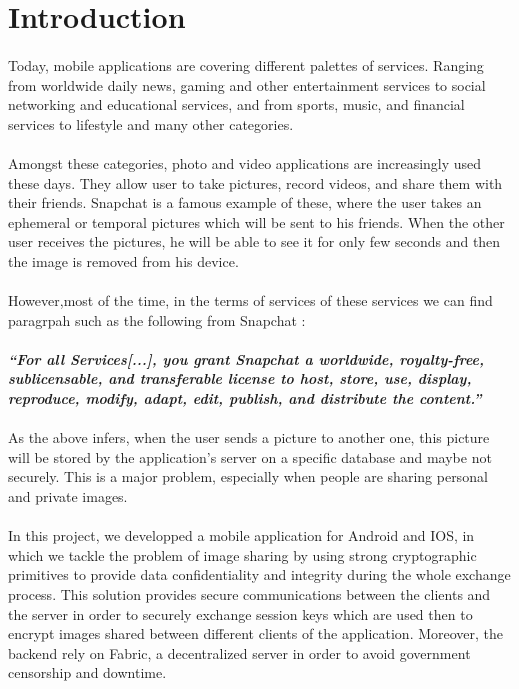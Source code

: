 \section{Introduction}
   \paragraph{}
    Today, mobile applications are covering different palettes of services. Ranging from worldwide daily news, gaming and other entertainment services to social networking and educational services, and from sports, music, and financial services to lifestyle and many other categories.
   \paragraph{}
    Amongst these categories, photo and video applications are increasingly used these days. They allow user to take pictures, record videos, and share them with their friends. Snapchat is a famous example of these, where the user takes an ephemeral or temporal pictures which will be sent to his friends. When the other user receives the pictures, he will be able to see it for only few seconds and then the image is removed from his device.
    \paragraph{}
    However,most of the time, in the terms of services of these services we can find paragrpah such as the following from Snapchat :
    \paragraph{}
    \textbf{\textit{\enquote{For all Services[...], you grant Snapchat a worldwide, royalty-free, sublicensable, and transferable license to host, store, use, display, reproduce, modify, adapt, edit, publish, and distribute the content.}}}
    \paragraph{}
    As the above infers, when the user sends a picture to another one, this picture will be stored by the application's server on a specific database and maybe not securely. This is a major problem, especially when people are sharing personal and private images.
    \paragraph{}
    In this project, we developped a mobile application for Android and IOS, in which we tackle the problem of image sharing by using strong cryptographic primitives to provide data confidentiality and integrity during the whole exchange process. This solution provides secure communications between the clients and the server in order to securely exchange session keys which are used then to encrypt images shared between different clients of the application. Moreover, the backend rely on Fabric, a decentralized server in order to avoid government censorship and downtime.

